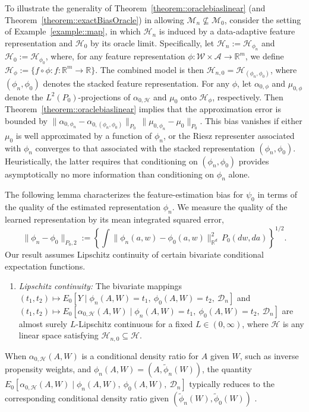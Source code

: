 \documentclass[11pt]{article}
\theoremstyle{definition}
\begin{document}
To illustrate the generality of Theorem~\ref{theorem::oraclebiaslinear} (and Theorem~\ref{theorem::exactBiasOracle}) in allowing \(\mathcal{M}_n \not\subseteq \mathcal{M}_0\), consider the setting of Example~\ref{example::map}, in which \(\mathcal{H}_n\) is induced by a data-adaptive feature representation and \(\mathcal{H}_0\) by its oracle limit. Specifically, let \(\mathcal{H}_n := \mathcal{H}_{\phi_n}\) and \(\mathcal{H}_0 := \mathcal{H}_{\phi_0}\), where, for any feature representation \(\phi:\mathcal{W}\times\mathcal{A}\to\mathbb{R}^m\), we define \(\mathcal{H}_{\phi} := \{f\circ\phi : f:\mathbb{R}^m\to\mathbb{R}\}\). The combined model is then \(\mathcal{H}_{n,0} = \mathcal{H}_{(\phi_n,\phi_0)}\), where \((\phi_n,\phi_0)\) denotes the stacked feature representation. For any \(\phi\), let \(\alpha_{0,\phi}\) and \(\mu_{0,\phi}\) denote the \(L^2(P_0)\)-projections of \(\alpha_{0,\mathcal H}\) and \(\mu_0\) onto \(\mathcal{H}_{\phi}\), respectively. Then Theorem~\ref{theorem::oraclebiaslinear} implies that the approximation error is bounded by $\|\alpha_{0,\phi_n}-\alpha_{0,(\phi_n,\phi_0)}\|_{P_0}\,\|\mu_{0,\phi_n}-\mu_0\|_{P_0}.$
This bias vanishes if either \(\mu_0\) is well approximated by a function of \(\phi_n\), or the Riesz representer associated with \(\phi_n\) converges to that associated with the stacked representation \((\phi_n,\phi_0)\). Heuristically, the latter requires that conditioning on \((\phi_n,\phi_0)\) provides asymptotically no more information than conditioning on \(\phi_n\) alone.


The following lemma characterizes the feature-estimation bias for $\psi_0$ in terms of the quality of the estimated representation \(\phi_n\). We measure the quality of the learned representation by its mean integrated squared error,
\[
\|\phi_n-\phi_0\|_{P_0,2}
:=
\left\{\int \|\phi_n(a,w)-\phi_0(a,w)\|_{\mathbb{R}^d}^2\,P_0(dw,da)\right\}^{1/2}.
\]
Our result assumes Lipschitz continuity of certain bivariate conditional expectation functions.

\begin{enumerate}[label=(B\arabic*), ref=B\arabic*, resume=condlinear]
    \item \textit{Lipschitz continuity:} The bivariate mappings
$(t_1,t_2)\mapsto E_0[Y\mid \phi_n(A,W)=t_1,\ \phi_0(A,W)=t_2,\ \mathcal{D}_n]$ and $ (t_1,t_2)\mapsto E_0[\alpha_{0,\mathcal H}(A,W)\mid \phi_n(A,W)=t_1,\ \phi_0(A,W)=t_2,\ \mathcal{D}_n]$    are almost surely \(L\)-Lipschitz continuous for a fixed $L \in (0,\infty)$, where \(\mathcal H\) is any linear space satisfying \(\mathcal{H}_{n,0}\subseteq\mathcal H\). \label{cond::lipschitzFeature}
\end{enumerate}
When \(\alpha_{0,\mathcal H}(A,W)\) is a conditional density ratio for \(A\) given \(W\), such as inverse propensity weights, and \(\phi_n(A,W) = (A, \widetilde{\phi}_n(W))\), the quantity $E_0[\alpha_{0,\mathcal H}(A,W)\mid \phi_n(A,W),\ \phi_0(A,W),\ \mathcal{D}_n]$ typically reduces to the corresponding conditional density ratio given \((\widetilde{\phi}_n(W),\widetilde{\phi}_0(W))\) \citep{ATEsupereff}.
\end{document}
